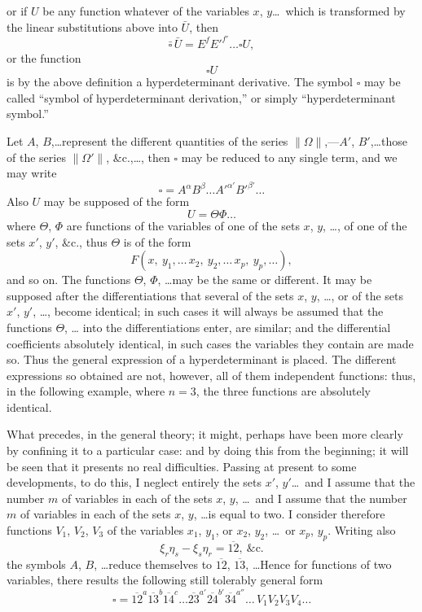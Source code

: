\documentclass[11pt,a4paper]{article}
\theoremstyle{plain}
\theoremstyle{definition}
\theoremstyle{remark}
\begin{document}
\newpage

or if $U$ be any function whatever of the variables $x$, $y$\ldots\ which is transformed by
the linear substitutions above into $\bar{U}$, then
\[
\bar{\square}\,\bar{U} = E^f E'^{f'}\ldots\square U,
\]
or the function
\[
\square U
\]
is by the above definition a hyperdeterminant derivative. The symbol $\square$ may be called
``symbol of hyperdeterminant derivation,'' or simply ``hyperdeterminant symbol.''

Let $A$, $B$,\ldots represent the different quantities of the series $\|\Omega\|$,---$A'$, $B'$,\ldots those of
the series $\|\Omega'\|$, \&c.,\ldots, then $\square$ may be reduced to any single term, and we may write
\[
\square = A^\alpha B^\beta\ldots A'^{\alpha'} B'^{\beta'}\ldots
\]
Also $U$ may be supposed of the form
\[
U = \Theta\Phi\ldots
\]
where $\Theta$, $\Phi$ are functions of the variables of one of the sets $x$, $y$, \ldots, of one of the
sets $x'$, $y'$, \&c., thus $\Theta$ is of the form
\[
F(x,\ y_1,\ldots\,x_2,\ y_2,\ldots\,x_p,\ y_p,\ldots),
\]
and so on. The functions $\Theta$, $\Phi$, \ldots may be the same or different. It may be supposed
after the differentiations that several of the sets $x$, $y$, \ldots, or of the sets $x'$, $y'$, \ldots,
become identical; in such cases it will always be assumed that the functions $\Theta$, \ldots
into the differentiations enter, are similar; and the differential coefficients absolutely
identical, in such cases the variables they contain are made so. Thus the general expression
of a hyperdeterminant is placed. The different expressions so obtained are not, however, all of them
independent functions: thus, in the following example, where $n=3$, the three functions
are absolutely identical.

What precedes, in the general theory; it might, perhaps have been more clearly
by confining it to a particular case: and by doing this from the beginning; it will
be seen that it presents no real difficulties. Passing at present to some developments,
to do this, I neglect entirely the sets $x'$, $y'$\ldots\ and I assume that the number $m$ of
variables in each of the sets $x$, $y$, \ldots\ and I assume that the number $m$ of
variables in each of the sets $x$, $y$, \ldots is equal to two. I consider therefore functions
$V_1$, $V_2$, $V_3$ of the variables $x_1$, $y_1$, or $x_2$, $y_2$, \ldots\ or $x_p$, $y_p$. Writing also
\[
\xi_r\eta_s - \xi_s\eta_r = \overline{12},\ \&\text{c.}
\]
the symbols $A$, $B$, \ldots reduce themselves to $\overline{12}$, $\overline{13}$, \ldots Hence for functions of two
variables, there results the following still tolerably general form
\[
\square = \overline{12}^a\overline{13}^b\overline{14}^c\ldots\overline{23}^{a'}\overline{24}^{b'}\overline{34}^{a''}\ldots\,V_1V_2V_3V_4\ldots
\]
\end{document}
